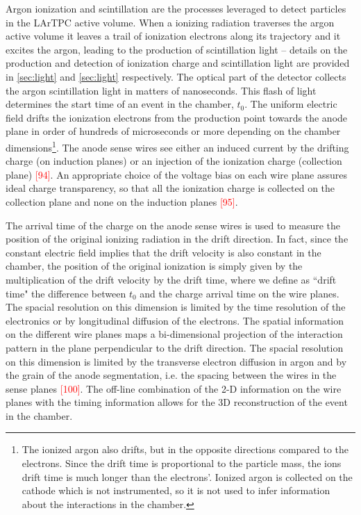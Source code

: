 Argon ionization and scintillation are the processes leveraged to detect particles in the LArTPC active volume.  When a ionizing radiation traverses the argon active volume it leaves a trail of ionization electrons along its trajectory and it excites the argon, leading to the production of scintillation light -- details on the production and detection of ionization charge and scintillation light are provided in \ref{sec:light} and \ref{sec:light} respectively. The optical part of the detector collects the argon scintillation light in matters of nanoseconds. This flash of light determines the start time of an event in the chamber, $t_0$. The uniform electric field drifts the ionization  electrons from the production point towards the anode plane in order of hundreds of microseconds or more depending on the chamber dimensions\footnote{The ionized argon also drifts, but  in the opposite directions compared to the electrons. Since the drift time is proportional to the particle mass,  the ions drift time is much longer than the electrons'.  Ionized argon is collected on the cathode which is not instrumented, so it is not used to infer information about the interactions in the chamber.}. The anode sense wires see either an induced current by the drifting charge (on induction planes) or an injection of the ionization charge (collection plane) \textcolor{red}{[94]}.    An appropriate choice of the voltage bias on each wire plane assures ideal charge transparency, so that all the ionization charge is collected on the collection plane and none on the induction planes \textcolor{red}{[95]}.  

The arrival time of the charge on the anode sense wires is used to measure the position of the original ionizing radiation in the drift direction. In fact, since the constant electric field implies that the drift velocity is also constant in the chamber, the position of the original ionization is simply given by the multiplication of the drift velocity by the drift time, where we define as ``drift time" the difference between $t_0$ and the charge arrival time on the wire planes. The spacial resolution on this dimension is limited by the time resolution of the electronics or by longitudinal diffusion of the electrons.
The spatial information on the different wire planes maps a bi-dimensional projection of the interaction pattern in the plane perpendicular to the drift direction. The spacial resolution on this dimension is limited by the transverse electron diffusion in argon and by the grain of the anode segmentation, i.e. the spacing between the wires in the sense planes \textcolor{red}{[100]}.  The off-line combination of the 2-D information on the wire planes with the timing information allows for the 3D reconstruction of the event in the chamber.

